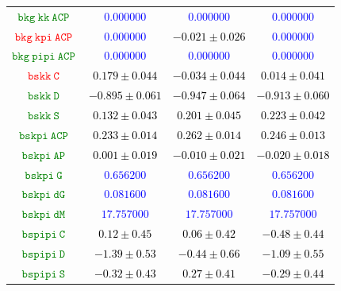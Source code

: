 \documentclass[10pt,a4paper]{article}
\begin{document}
\begin{table}[h!]
{\begin{tabular}{cccc}
\textcolor{Green}{$\mathtt{bkg~kk~ACP~}$} & \textcolor{blue}{$0.000000$}& \textcolor{blue}{$0.000000$}& \textcolor{blue}{$0.000000$}\\
\textcolor{red}{$\mathtt{bkg~kpi~ACP~}$} & \textcolor{blue}{$0.000000$}& \textcolor{black}{$-0.021 \pm 0.026$}& \textcolor{blue}{$0.000000$}\\
\textcolor{Green}{$\mathtt{bkg~pipi~ACP~}$} & \textcolor{blue}{$0.000000$}& \textcolor{blue}{$0.000000$}& \textcolor{blue}{$0.000000$}\\
\textcolor{red}{$\mathtt{bskk~C~}$} & \textcolor{black}{$0.179 \pm 0.044$}& \textcolor{black}{$-0.034 \pm 0.044$}& \textcolor{black}{$0.014 \pm 0.041$}\\
\textcolor{Green}{$\mathtt{bskk~D~}$} & \textcolor{black}{$-0.895 \pm 0.061$}& \textcolor{black}{$-0.947 \pm 0.064$}& \textcolor{black}{$-0.913 \pm 0.060$}\\
\textcolor{Green}{$\mathtt{bskk~S~}$} & \textcolor{black}{$0.132 \pm 0.043$}& \textcolor{black}{$0.201 \pm 0.045$}& \textcolor{black}{$0.223 \pm 0.042$}\\
\textcolor{Green}{$\mathtt{bskpi~ACP~}$} & \textcolor{black}{$0.233 \pm 0.014$}& \textcolor{black}{$0.262 \pm 0.014$}& \textcolor{black}{$0.246 \pm 0.013$}\\
\textcolor{Green}{$\mathtt{bskpi~AP~}$} & \textcolor{black}{$0.001 \pm 0.019$}& \textcolor{black}{$-0.010 \pm 0.021$}& \textcolor{black}{$-0.020 \pm 0.018$}\\
\textcolor{Green}{$\mathtt{bskpi~G~}$} & \textcolor{blue}{$0.656200$}& \textcolor{blue}{$0.656200$}& \textcolor{blue}{$0.656200$}\\
\textcolor{Green}{$\mathtt{bskpi~dG~}$} & \textcolor{blue}{$0.081600$}& \textcolor{blue}{$0.081600$}& \textcolor{blue}{$0.081600$}\\
\textcolor{Green}{$\mathtt{bskpi~dM~}$} & \textcolor{blue}{$17.757000$}& \textcolor{blue}{$17.757000$}& \textcolor{blue}{$17.757000$}\\
\textcolor{Green}{$\mathtt{bspipi~C~}$} & \textcolor{black}{$0.12 \pm 0.45$}& \textcolor{black}{$0.06 \pm 0.42$}& \textcolor{black}{$-0.48 \pm 0.44$}\\
\textcolor{Green}{$\mathtt{bspipi~D~}$} & \textcolor{black}{$-1.39 \pm 0.53$}& \textcolor{black}{$-0.44 \pm 0.66$}& \textcolor{black}{$-1.09 \pm 0.55$}\\
\textcolor{Green}{$\mathtt{bspipi~S~}$} & \textcolor{black}{$-0.32 \pm 0.43$}& \textcolor{black}{$0.27 \pm 0.41$}& \textcolor{black}{$-0.29 \pm 0.44$}\\

\end{tabular}}
\end{table}
\end{document}
